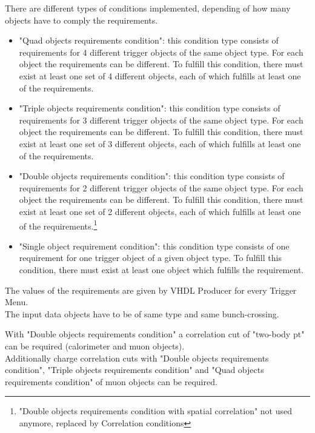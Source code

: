 There are different types of conditions implemented, depending of how many objects have to comply the requirements.
\begin{itemize}
\item "Quad objects requirements condition": this condition type consists of requirements for 4 different trigger objects of the same object type.
For each object the requirements can be different. To fulfill this condition, there must exist at least one set of 4 different objects,
each of which fulfills at least one of the requirements.
\item "Triple objects requirements condition": this condition type consists of requirements for 3 different trigger objects of the same object type.
For each object the requirements can be different. To fulfill this condition, there must exist at least one set of 3 different objects,
each of which fulfills at least one of the requirements.
\item "Double objects requirements condition": this condition type consists of requirements for 2 different trigger objects of the same object type.
For each object the requirements can be different. To fulfill this condition, there must exist at least one set of 2 different objects,
each of which fulfills at least one of the requirements.\footnote{"Double objects requirements condition with spatial correlation" not used anymore, replaced by Correlation conditions}
\item "Single object requirement condition": this condition type consists of one requirement for one trigger object of a given object type.
To fulfill this condition, there must exist at least one object which fulfills the requirement.
\end{itemize}

The values of the requirements are given by VHDL Producer for every Trigger Menu.\\
The input data objects have to be of same type and same bunch-crossing.

With "Double objects requirements condition" a correlation cut of "two-body pt" can be required (calorimeter and muon objects).\\
Additionally charge correlation cuts with "Double objects requirements condition", "Triple objects requirements condition" and "Quad objects requirements condition" of muon objects can be required.

